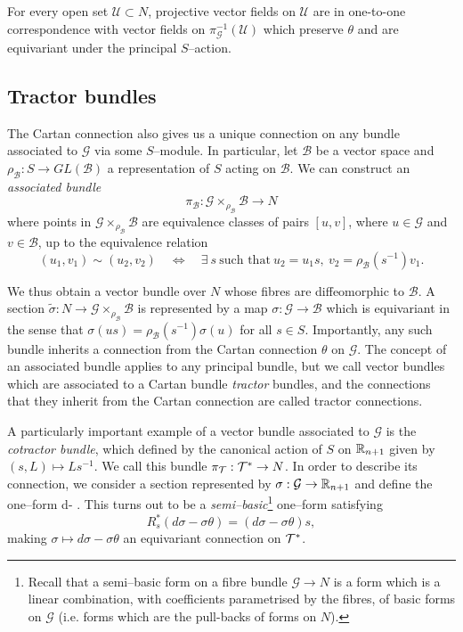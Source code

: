 \begin{rmk} \label{rmk:theta_symmetry}
For every open set $\mathcal{U}\subset N$, projective vector fields on $\mathcal{U}$ are in one-to-one correspondence with vector fields on $\pi_\mathcal{G}^{-1}(\mathcal{U})$
which preserve $\theta$ and are equivariant under the principal $S$--action.
\end{rmk}






\subsection{Tractor bundles}
The Cartan connection also gives us a unique connection on any bundle associated to $\mathcal{G}$ via some $S$--module. In particular, let $\mathcal{B}$ be a vector space and $\rho_\mathcal{B}:S\rightarrow GL(\mathcal{B})$ a representation of $S$ acting on $\mathcal{B}$. We can construct an \textit{associated bundle}
\[\pi_\mathcal{B}:\mathcal{G}\times_{\rho_\mathcal{B}} \mathcal{B}\rightarrow N \]
where points in $\mathcal{G}\times_{\rho_\mathcal{B}} \mathcal{B}$ are equivalence classes of pairs $[u,v]$, where $u\in \mathcal{G}$ and $v\in \mathcal{B}$, up to the equivalence relation
\[
(u_1,v_1)\sim (u_2,v_2) \quad \Leftrightarrow \quad \exists\ s\ \mbox{such that}\  u_2=u_1 s,\  v_2 = \rho_\mathcal{B}(s^{-1}) v_1.
\]

We thus obtain a vector bundle over $N$ whose fibres are diffeomorphic to $\mathcal{B}$. A section $\tilde{\sigma}:N\rightarrow \mathcal{G}\times_{\rho_\mathcal{B}} \mathcal{B}$ is represented by a map ${\sigma}:\mathcal{G}\rightarrow \mathcal{B}$ which is equivariant in the sense that ${\sigma}(us)=\rho_\mathcal{B}(s^{-1}){\sigma}(u)$ for all $s\in S$. Importantly, any such bundle inherits a connection from the Cartan connection $\theta$ on $\mathcal{G}$. The concept of an associated bundle applies to any principal bundle, but we call vector bundles which are associated to a Cartan bundle \textit{tractor} bundles, and the connections that they inherit from the Cartan connection are called tractor connections.

A particularly important example of a vector bundle associated to $\mathcal{G}$ is the \textit{cotractor bundle}, which defined by the canonical action of $S$ on $\mathbb{R}_{n+1}$ given by $(s,L)\mapsto Ls^{-1}$. We call this bundle $\pi_\mathcal{T}:\mathcal{T}^*\rightarrow N$. In order to describe its connection, we consider a section represented by $\sigma:\mathcal{G}\rightarrow\mathbb{R}_{n+1}$ and define the one--form
\be \label{eq:df-ftheta}
d\sigma - \sigma\theta.
\ee
This turns out to be a \textit{semi--basic}\footnote{Recall that a semi--basic form on a fibre bundle $\mathcal{G}\rightarrow N$ is a form which is a linear combination, with coefficients parametrised by the fibres, of basic forms on $\mathcal{G}$ (i.e. forms which are the pull-backs of forms on $N$).} one--form satisfying
\[
R_s^*(d\sigma-\sigma\theta) = (d\sigma - \sigma\theta)s,
\]
making $\sigma\mapsto d\sigma-\sigma\theta$ an equivariant connection on $\mathcal{T}^*$.

